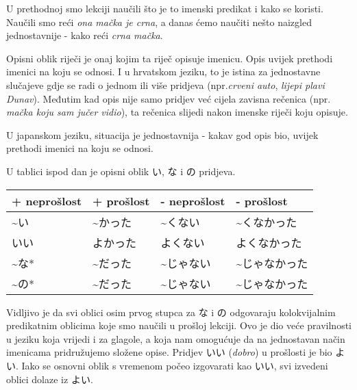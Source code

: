 \fi	

\newpage
{}

	
	U prethodnoj smo lekciji naučili što je to imenski predikat i kako se koristi. Naučili smo reći \textit{ona mačka je crna}, a danas ćemo naučiti nešto naizgled jednostavnije - kako reći \textit{crna mačka}.
	
	
	Opisni oblik riječi je onaj kojim ta riječ opisuje imenicu. Opis uvijek prethodi imenici na koju se odnosi. I u hrvatskom jeziku, to je istina za jednostavne slučajeve gdje se radi o jednom ili više pridjeva (npr.\textit{crveni auto}, \textit{lijepi plavi Dunav}). Međutim kad opis nije samo pridjev već cijela zavisna rečenica (npr. \textit{mačka koju sam jučer vidio}), ta rečenica slijedi nakon imenske riječi koju opisuje.
	
	U japanskom jeziku, situacija je jednostavnija - kakav god opis bio, uvijek prethodi imenici na koju se odnosi.
	
	U tablici ispod dan je opisni oblik い, な i の pridjeva.
	
	\begin{table}[h]
		\centering
		\begin{tabular}{l l l l}\toprule[2pt]
			+ neprošlost & + prošlost & - neprošlost & - prošlost\\
			\midrule
			\textasciitilde い & \textasciitilde かった & \textasciitilde くない & \textasciitilde くなかった\\
			いい & よかった & よくない & よくなかった\\
			\textasciitilde な* & \textasciitilde だった & \textasciitilde じゃない & \textasciitilde じゃなかった\\
			\textasciitilde の* & \textasciitilde だった & \textasciitilde じゃない & \textasciitilde じゃなかった\\
			\bottomrule[2pt]
		\end{tabular}
	\end{table}

	Vidljivo je da svi oblici osim prvog stupca za な i の odgovaraju kolokvijalnim predikatnim oblicima koje smo naučili u prošloj lekciji. Ovo je dio veće pravilnosti u jeziku koja vrijedi i za glagole, a koja nam omogućuje da na jednostavan način imenicama pridružujemo složene opise. Pridjev いい (\textit{dobro}) u prošlosti je bio よい. Iako se osnovni oblik s vremenom počeo izgovarati kao いい, svi izvedeni oblici dolaze iz よい.
	
